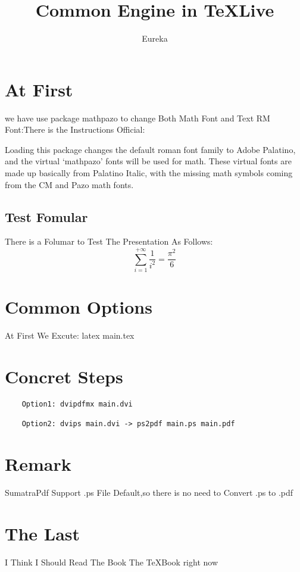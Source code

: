 \documentclass[12pt]{article}
\title{Common Engine in \TeX Live}
\author{Eureka}
\date{}
\begin{document}
\maketitle

\section{At First}

we have use package mathpazo to change Both Math Font and Text RM Font:There is the Instructions Official:

Loading this package changes the default roman font family to Adobe Palatino, and
the virtual ‘mathpazo’ fonts will be used for math. These virtual fonts are made
up basically from Palatino Italic, with the missing math symbols coming from the
CM and Pazo math fonts.


\subsection{Test Fomular}

There is a Folumar to Test The Presentation As Follows:
\[
    \sum_{i=1}^{+\infty}{\frac{1}{i^2}} = \frac{\pi^2}{6}    
\]

\section{Common Options}
    At First We Excute: latex main.tex

\section{Concret Steps}
\begin{verbatim}
    Option1: dvipdfmx main.dvi

    Option2: dvips main.dvi -> ps2pdf main.ps main.pdf 
\end{verbatim}

\section{Remark}
    SumatraPdf Support .ps File Default,so there is no need to Convert .ps to .pdf

\section{The Last}
I Think I Should Read The Book The {\rmfamily \TeX Book} right now
\end{document}
